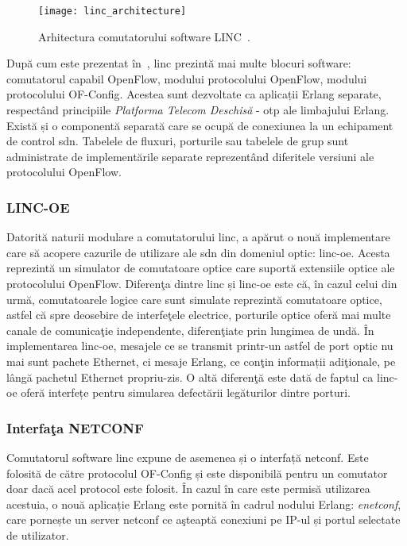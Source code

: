\begin{figure}[h]
	\centering
	\texttt{[image: linc\_architecture]}
	\caption{Arhitectura comutatorului software LINC~\cite{linc2014qsg}.}
	\label{fig:linc_architecture}
\end{figure}

După cum este prezentat în~\cite{linc2014qsg}, \gls{linc} prezintă mai multe blocuri software: comutatorul capabil OpenFlow, modului protocolului OpenFlow, modului protocolului OF-Config. Acestea sunt dezvoltate ca aplicații Erlang separate, respectând principiile \textit{Platforma Telecom Deschisă} - \gls{otp} ale limbajului Erlang. Există și o componentă separată care se ocupă de conexiunea la un echipament de control \gls{sdn}. Tabelele de fluxuri, porturile sau tabelele de grup sunt administrate de implementările separate reprezentând diferitele versiuni ale protocolului OpenFlow.

\subsubsection{LINC-OE}

Datorită naturii modulare a comutatorului \gls{linc}, a apărut o nouă implementare care să acopere cazurile de utilizare ale \gls{sdn} din domeniul optic: \gls{linc-oe}. Acesta reprezintă un simulator de comutatoare optice care suportă extensiile optice ale protocolului OpenFlow. Diferenţa dintre \gls{linc} și \gls{linc-oe} este că, în cazul celui din urmă, comutatoarele logice care sunt simulate reprezintă comutatoare optice, astfel că spre deosebire de interfeţele electrice, porturile optice oferă mai multe canale de comunicaţie independente, diferenţiate prin lungimea de undă. În implementarea \gls{linc-oe}, mesajele ce se transmit printr-un astfel de port optic nu mai sunt pachete Ethernet, ci mesaje Erlang, ce conţin informații adiţionale, pe lângă pachetul Ethernet propriu-zis. O altă diferenţă este dată de faptul ca \gls{linc-oe} oferă interfețe pentru simularea defectării legăturilor dintre porturi.

\subsubsection{Interfaţa NETCONF}

Comutatorul software \gls{linc} expune de asemenea și o interfață \gls{netconf}. Este folosită de către protocolul OF-Config și este disponibilă pentru un comutator doar dacă acel protocol este folosit. În cazul în care este permisă utilizarea acestuia, o nouă aplicație Erlang este pornită în cadrul nodului Erlang: \textit{enetconf}, care pornește un server \gls{netconf} ce aşteaptă conexiuni pe IP-ul și portul selectate de utilizator.

